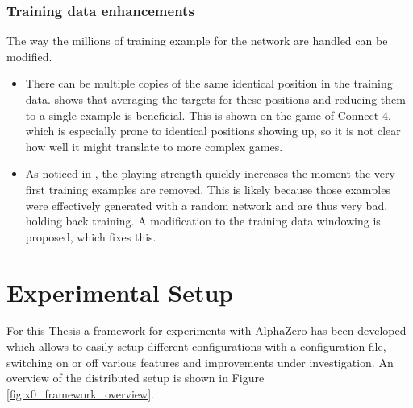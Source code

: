 \documentclass[12pt,onecolumn,oneside,titlepage]{article}
\begin{document}
\subsubsection{Training data enhancements}

The way the millions of training example for the network are handled can be modified.

\begin{itemize}
 \item There can be multiple copies of the same identical position in the training data. \cite{oracledevs6} shows that averaging the targets for these positions and reducing them to a single example is beneficial. This is shown on the game of Connect 4,
 which is especially prone to identical positions showing up, so it is not clear how well it might translate to more complex games.
 \item As noticed in \cite{oracledevs6}, the playing strength quickly increases the moment the very first training examples are removed. This is likely because those examples were effectively generated with a random network and are thus very bad, holding back training.
 A modification to the training data windowing is proposed, which fixes this.
\end{itemize}





\section{Experimental Setup} \label{s:experiments}

For this Thesis a framework for experiments with AlphaZero has been developed which allows to easily setup different configurations with a configuration file, switching on or off various features and improvements under investigation.
An overview of the distributed setup is shown in Figure \ref{fig:x0_framework_overview}.
\end{document}
